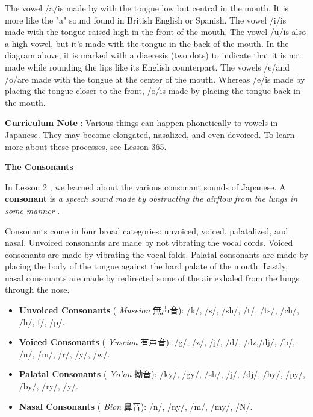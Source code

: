 \par{ The vowel \slash a\slash  is made by with the tongue low but central in the mouth. It is more like the "a" sound found in British English or Spanish. The vowel \slash i\slash  is made with the tongue raised high in the front of the mouth. The vowel \slash u\slash  is also a high-vowel, but it's made with the tongue in the back of the mouth. In the diagram above, it is marked with a diaeresis (two dots) to indicate that it is not made while rounding the lips like its English counterpart. The vowels \slash e\slash  and \slash o\slash  are made with the tongue at the center of the mouth. Whereas \slash e\slash  is made by placing the tongue closer to the front, \slash o\slash  is made by placing the tongue back in the mouth. }

\par{\textbf{Curriculum Note }: Various things can happen phonetically to vowels in Japanese. They may become elongated, nasalized, and even devoiced. To learn more about these processes, see Lesson 365. }

\begin{center}
\textbf{The Consonants }
\end{center}

\par{ In Lesson 2  , we learned about the various consonant sounds of Japanese. A \textbf{consonant }is \emph{a speech sound made by obstructing the airflow from the lungs in some manner }. }

\par{ Consonants come in four broad categories: unvoiced, voiced, palatalized, and nasal. Unvoiced consonants are made by not vibrating the vocal cords. Voiced consonants are made by vibrating the vocal folds. Palatal consonants are made by placing the body of the tongue against the hard palate of the mouth. Lastly, nasal consonants are made by redirected some of the air exhaled from the lungs through the nose. }

\begin{itemize}

\item \textbf{Unvoiced Consonants }( \emph{Museion }無声音): \slash k\slash , \slash s\slash , \slash sh\slash , \slash t\slash , \slash ts\slash , \slash ch\slash , \slash h\slash , f\slash , \slash p\slash . 
\item \textbf{Voiced Consonants }( \emph{Yūseion }有声音): \slash g\slash , \slash z\slash , \slash j\slash , \slash d\slash , \slash dz,\slash  dj\slash , \slash b\slash , \slash n\slash , \slash m\slash , \slash r\slash , \slash y\slash , \slash w\slash . 
\item \textbf{Palatal Consonants }( \emph{Yō'on }拗音): \slash ky\slash , \slash gy\slash , \slash sh\slash , \slash j\slash , \slash dj\slash , \slash hy\slash , \slash py\slash , \slash by\slash , \slash ry\slash , \slash y\slash . 
\item \textbf{Nasal Consonants }( \emph{Bion }鼻音): \slash n\slash , \slash ny\slash , \slash m\slash , \slash my\slash , \slash N\slash . 
\end{itemize}

